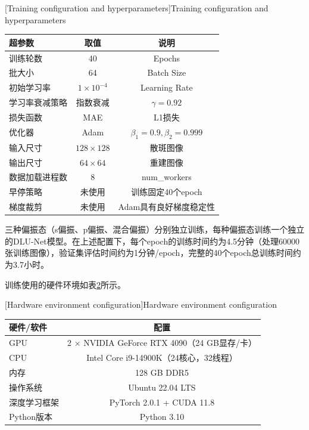 {\begin{table}[!htbp]
    \centering
    [Training configuration and hyperparameters]{\enspace Training configuration and hyperparameters}
    \label{tab:training_params}
    \footnotesize
    \setlength{\tabcolsep}{8pt}
    \renewcommand{\arraystretch}{1.2}
    \begin{tabular}{lcc}
        \hline
        \textbf{超参数} & \textbf{取值} & \textbf{说明} \\
        \hline
        训练轮数 & 40 & Epochs \\
        批大小 & 64 & Batch Size \\
        初始学习率 & $1 \times 10^{-4}$ & Learning Rate \\
        学习率衰减策略 & 指数衰减 & $\gamma = 0.92$ \\
        损失函数 & MAE & L1损失 \\
        优化器 & Adam & $\beta_1=0.9, \beta_2=0.999$ \\
        输入尺寸 & $128\times128$ & 散斑图像 \\
        输出尺寸 & $64\times64$ & 重建图像 \\
        数据加载进程数 & 8 & num\_workers \\
        早停策略 & 未使用 & 训练固定40个epoch \\
        梯度裁剪 & 未使用 & Adam具有良好梯度稳定性 \\
        \hline
    \end{tabular}
\end{table}

三种偏振态（s偏振、p偏振、混合偏振）分别独立训练，每种偏振态训练一个独立的DLU-Net模型。在上述配置下，每个epoch的训练时间约为4.5分钟（处理60000张训练图像），验证集评估时间约为1分钟/epoch，完整的40个epoch总训练时间约为3.7小时。

训练使用的硬件环境如表\ref{tab:hardware_env}所示。
\begin{table}[!htbp]
    \centering
    [Hardware environment configuration]{\enspace Hardware environment configuration}
    \label{tab:hardware_env}
    \setlength{\tabcolsep}{8pt}
    \renewcommand{\arraystretch}{1.2}
    \begin{tabular}{lc}
        \hline
        \textbf{硬件/软件} & \textbf{配置} \\
        \hline
        GPU & 2 × NVIDIA GeForce RTX 4090（24 GB显存/卡） \\
        CPU & Intel Core i9-14900K（24核心，32线程） \\
        内存 & 128 GB DDR5 \\
        操作系统 & Ubuntu 22.04 LTS \\
        深度学习框架 & PyTorch 2.0.1 + CUDA 11.8 \\
        Python版本 & Python 3.10 \\
        \hline
    \end{tabular}
\end{table}

}
